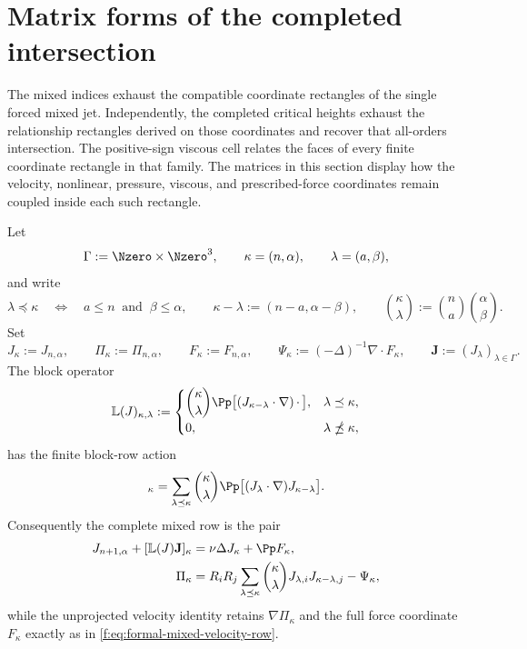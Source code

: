 \section{Matrix forms of the completed intersection}
\label{f:sec:matrix-forms}

The mixed indices exhaust the compatible coordinate rectangles of the single
forced mixed jet.  Independently, the completed critical heights exhaust the
relationship rectangles derived on those coordinates and recover that
all-orders intersection.  The positive-sign viscous cell relates the faces of
every finite coordinate rectangle in that family.  The matrices in this section
display how the velocity, nonlinear, pressure,
viscous, and prescribed-force coordinates remain coupled inside each such
rectangle.

\begin{proposition}
\label{f:prop:formal-mixed-index-matrix}
Let
\[
 \Gamma:=\Nzero\times\Nzero^3,
 \qquad
 \kappa=(n,\alpha),
 \qquad
 \lambda=(a,\beta),
\]
and write
\[
 \lambda\preceq\kappa
 \quad\Longleftrightarrow\quad
 a\le n\ \text{ and }\ \beta\le\alpha,
 \qquad
 \kappa-\lambda:=(n-a,\alpha-\beta),
 \qquad
 \binom\kappa\lambda:=\binom na\binom\alpha\beta.
\]
Set
\[
 J_\kappa:=J_{n,\alpha},
 \qquad
 \Pi_\kappa:=\Pi_{n,\alpha},
 \qquad
 F_\kappa:=F_{n,\alpha},
 \qquad
 \Psi_\kappa:=(-\Delta)^{-1}\nabla\cdot F_\kappa,
 \qquad
 \mathbf J:=(J_\lambda)_{\lambda\in\Gamma}.
\]
The block operator
\begin{equation}
 \mathbb L(J)_{\kappa,\lambda}
 :=
 \begin{cases}
 \displaystyle
 \binom\kappa\lambda
 \Pp\bigl[(J_{\kappa-\lambda}\cdot\nabla)\,\mathord\cdot\,\bigr],
 &\lambda\preceq\kappa,\\[6pt]
 0,&\lambda\npreceq\kappa,
 \end{cases}
 \label{f:eq:formal-mixed-transport-matrix}
\end{equation}
has the finite block-row action
\begin{equation}
 [\mathbb L(J)\mathbf J]_\kappa
 =\sum_{\lambda\preceq\kappa}\binom\kappa\lambda
   \Pp\bigl[(J_\lambda\cdot\nabla)J_{\kappa-\lambda}\bigr].
 \label{f:eq:formal-mixed-transport-row}
\end{equation}
Consequently the complete mixed row is the pair
\begin{align}
 J_{n+1,\alpha}+[\mathbb L(J)\mathbf J]_\kappa
 &=\nu\Delta J_\kappa+\Pp F_\kappa,
 \label{f:eq:formal-mixed-projected-matrix-row}\\
 \Pi_\kappa
 &=R_iR_j\sum_{\lambda\preceq\kappa}\binom\kappa\lambda
   J_{\lambda,i}J_{\kappa-\lambda,j}-\Psi_\kappa,
 \label{f:eq:formal-mixed-matrix-pressure-row}
\end{align}
while the unprojected velocity identity retains
\(\nabla\Pi_\kappa\) and the full force coordinate \(F_\kappa\) exactly as in
\eqref{f:eq:formal-mixed-velocity-row}.


\end{proposition}
